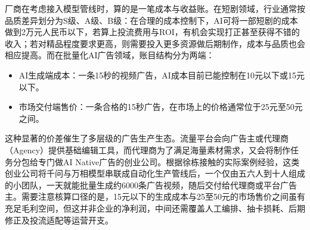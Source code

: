\documentclass[UTF8,a4paper,11pt,fontset=fandol]{ctexart}
\begin{document}
厂商在考虑接入模型管线时，算的是一笔成本与收益账。在短剧领域，行业通常按品质差异划分为S级、A级、B级：在合理的成本控制下，AI可将一部短剧的成本做到2万元人民币以下，若算上投流费用与ROI，有机会实现打正甚至获得不错的收入；若对精品程度要求更高，则需要投入更多资源做后期制作，成本与品质也会相应提高。而在批量化AI广告领域，账目结构分为两端：
\begin{itemize}
\item AI生成端成本：一条15秒的视频广告，AI成本目前已能控制在10元以下或15元以下。
\item 市场交付端售价：一条合格的15秒广告，在市场上的价格通常位于25元至50元之间。
\end{itemize}

这种显著的价差催生了多层级的广告生产生态。流量平台会向广告主或代理商（Agency）提供基础编辑工具，而代理商为了满足海量素材需求，又会将制作任务分包给专门做AI Native广告的创业公司。根据徐栋接触的实际案例经验，这类创业公司将千问与万相模型串联成自动化生产管线后，一个仅由五六人到十人组成的小团队，一天就能批量生成约6000条广告视频，随后交付给代理商或平台广告主。需要注意核算口径的是，15元以下的生成成本与25至50元的市场售价之间虽有充足毛利空间，但这并非企业的净利润，中间还需覆盖人工编排、抽卡损耗、后期修正及投流适配等运营开支。
\end{document}
